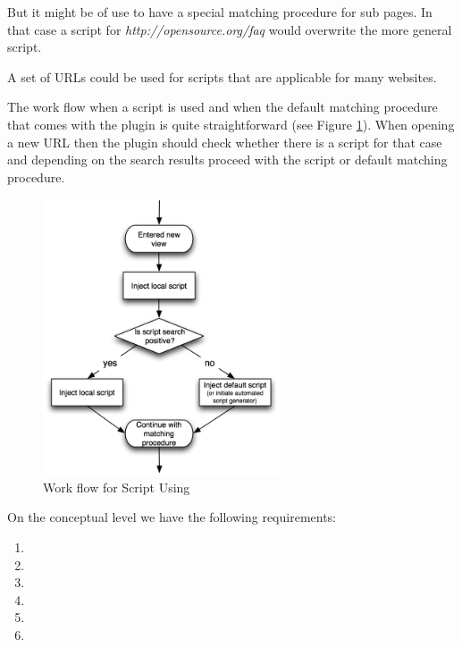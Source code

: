 But it might be of use to have a special matching procedure for sub pages.  In that case a script for \textit{http://opensource.org/faq} would overwrite the more general script. 

A set of URLs could be used for scripts that are applicable for many websites. 

The work flow when a script is used and when the default matching procedure that comes with the plugin is quite straightforward (see Figure \ref{script-usage-basic}). When opening a new URL then the plugin should check whether there is a script for that case and depending on the search results proceed with the script or default matching procedure.

\begin{figure}\centering
		\includegraphics[width=7cm]{images/script-usage-basic.png}
		\caption{Work flow for Script Using}
		\label{script-usage-basic}
\end{figure} 

On the conceptual level we have the following requirements:

\begin{enumerate}
\item \reqSi
\item \reqSii
\item \reqSiii
\item \reqSiv
\item \reqSv
\item \reqSvi
\end{enumerate}
